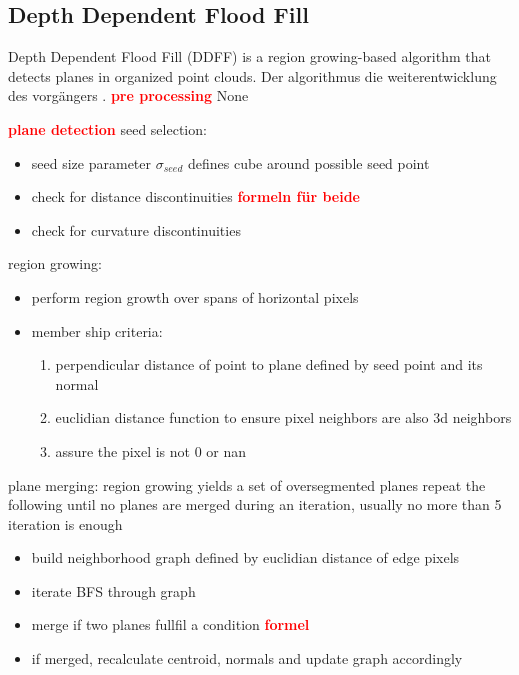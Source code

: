 \documentclass[main.tex]{subfiles}
\begin{document}
\subsection{Depth Dependent Flood Fill}
Depth Dependent Flood Fill (DDFF) is a region growing-based algorithm that detects planes in organized point clouds.
Der algorithmus die weiterentwicklung des vorgängers \cite{Roychoudhury_Missura_Bennewitz_2021}.
\textbf{\textcolor{red}{pre processing}}
None

\textbf{\textcolor{red}{plane detection}}
seed selection:

\begin{itemize}
    \item seed size parameter $\sigma_{seed}$ defines cube around possible seed point
    \item check for distance discontinuities  \textbf{\textcolor{red}{formeln für beide}}
    \item check for curvature discontinuities
\end{itemize}

region growing:
\begin{itemize}
    \item perform region growth over spans of horizontal pixels
    \item member ship criteria:
          \begin{enumerate}
              \item perpendicular distance of point to plane defined by seed point and its normal
              \item euclidian distance function to ensure pixel neighbors are also 3d neighbors
              \item assure the pixel is not 0 or nan
          \end{enumerate}
\end{itemize}

plane merging:
region growing yields a set of oversegmented planes
repeat the following until no planes are merged during an iteration, usually no more than 5 iteration is enough
\begin{itemize}
    \item build neighborhood graph defined by euclidian distance of edge pixels
    \item iterate BFS through graph
    \item merge if two planes fullfil a condition \textbf{\textcolor{red}{formel}}
    \item if merged, recalculate centroid, normals and update graph accordingly
\end{itemize}
\end{document}

